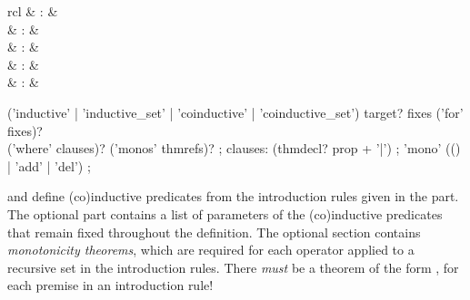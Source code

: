 \begin{isabellebody}
\begin{isamarkuptext}
  \begin{matharray}{rcl}
    \hypertarget{command.HOL.inductive}{\hyperlink{command.HOL.inductive}{\mbox{}}} & : &  \\
    \hypertarget{command.HOL.inductive-set}{\hyperlink{command.HOL.inductive-set}{\mbox{}}} & : &  \\
    \hypertarget{command.HOL.coinductive}{\hyperlink{command.HOL.coinductive}{\mbox{}}} & : &  \\
    \hypertarget{command.HOL.coinductive-set}{\hyperlink{command.HOL.coinductive-set}{\mbox{}}} & : &  \\
    \hypertarget{attribute.HOL.mono}{\hyperlink{attribute.HOL.mono}{\mbox{}}} & : & \isaratt \\
  \end{matharray}

  \begin{rail}
    ('inductive' | 'inductive\_set' | 'coinductive' | 'coinductive\_set') target? fixes ('for' fixes)? \\
    ('where' clauses)? ('monos' thmrefs)?
    ;
    clauses: (thmdecl? prop + '|')
    ;
    'mono' (() | 'add' | 'del')
    ;
  \end{rail}

  \begin{descr}

  \item [\hyperlink{command.HOL.inductive}{\mbox{\isa{\isacommand{inductive}}}} and \hyperlink{command.HOL.coinductive}{\mbox{\isa{\isacommand{coinductive}}}}] define (co)inductive predicates from the
  introduction rules given in the \hyperlink{keyword.where}{\mbox{}} part.  The
  optional \hyperlink{keyword.for}{\mbox{}} part contains a list of parameters of the
  (co)inductive predicates that remain fixed throughout the
  definition.  The optional \hyperlink{keyword.monos}{\mbox{}} section contains
  \emph{monotonicity theorems}, which are required for each operator
  applied to a recursive set in the introduction rules.  There
  \emph{must} be a theorem of the form ,
  for each premise  in an introduction rule!


\end{descr}
\end{isamarkuptext}
\end{isabellebody}
